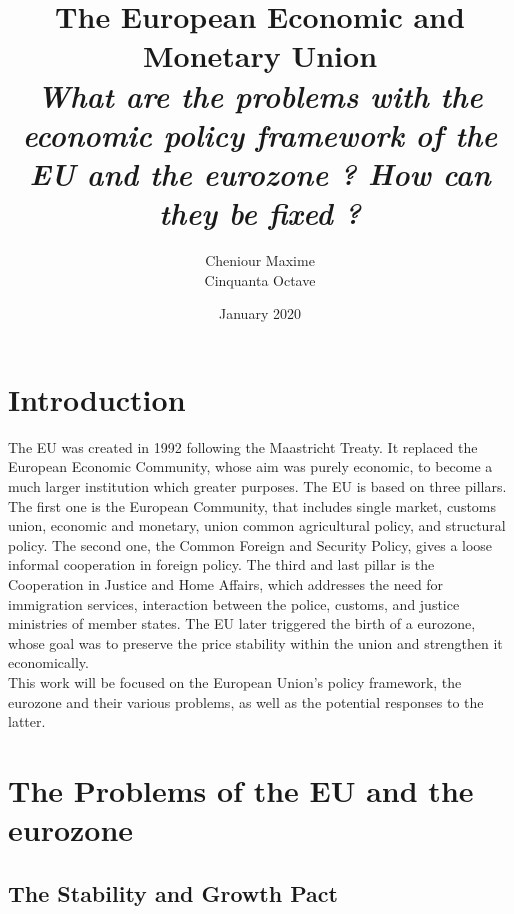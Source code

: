 \documentclass[12pt]{article}
\title{\textbf{The European Economic and Monetary Union} \\ \vspace{10 pt} \textit{What are the problems with the economic policy framework of the EU and the eurozone ? How can they be fixed ?}}
\author{Cheniour Maxime \\ Cinquanta Octave}
\date{January 2020}
\begin{document}
\maketitle

\tableofcontents

\section{Introduction}

The EU was created in 1992 following the Maastricht Treaty. It replaced the European Economic Community, whose aim was purely economic, to become a much larger institution which greater purposes. The EU is based on three pillars. The first one is the European Community, that includes single market, customs union,  economic and monetary, union common agricultural policy, and structural policy. The second one, the Common Foreign and Security Policy, gives a loose informal cooperation in foreign policy. The third and last pillar is the Cooperation in Justice and Home Affairs, which addresses the need for immigration services, interaction between the police, customs, and justice ministries of member states. The EU later triggered the birth of a eurozone, whose goal was to preserve the price stability within the union and strengthen it economically. \\
This work will be focused on the European Union’s policy framework, the eurozone and their various problems, as well as the potential responses to the latter.

\section{The Problems of the EU and the eurozone}

\subsection{The Stability and Growth Pact}
\end{document}
